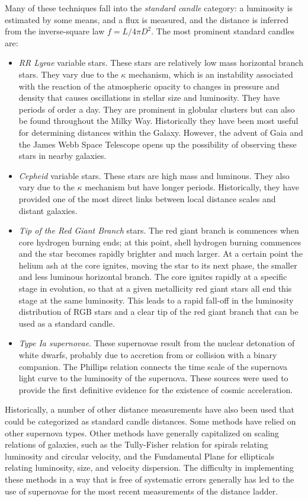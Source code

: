 Many of these techniques fall into the {\it standard candle} category:
a luminosity is estimated by some means, and a flux is measured, and
the distance is inferred from the inverse-square law $f=L/4\pi D^2$.
The most prominent standard candles are:
\begin{itemize}
\item {\it RR Lyrae} variable stars. These stars are relatively low mass
  horizontal branch stars. They vary due to the $\kappa$ mechanism,
  which is an instability associated with the reaction of the
  atmospheric opacity to changes in pressure and density that causes
  oscillations in stellar size and luminosity.  They have periods of
  order a day. They are prominent in globular clusters but can also be
  found throughout the Milky Way. Historically they have been most
  useful for determining distances within the Galaxy. However, the
  advent of Gaia and the James Webb Space Telescope opens up the
  possibility of observing these stars in nearby galaxies.
\item {\it Cepheid} variable stars. These stars are high mass and
  luminous.  They also vary due to the $\kappa$ mechanism but have
  longer periods. Historically, they have provided one of the most
  direct links between local distance scales and distant galaxies.
\item {\it Tip of the Red Giant Branch} stars. The red giant branch is
  commences when core hydrogen burning ends; at this point, shell
  hydrogen burning commences and the star becomes rapidly brighter and
  much larger. At a certain point the helium ash at the core ignites,
  moving the star to its next phase, the smaller and less luminous
  horizontal branch. The core ignites rapidly at a specific stage in
  evolution, so that at a given metallicity red giant stars all end
  this stage at the same luminosity. This leads to a rapid fall-off in
  the luminosity distribution of RGB stars and a clear tip of the red
  giant branch that can be used as a standard candle.
\item {\it Type Ia supernovae}. These supernovae result from the
  nuclear detonation of white dwarfs, probably due to accretion from
  or collision with a binary companion. The Phillips relation connects
  the time scale of the supernova light curve to the luminosity of the
  supernova. These sources were used to provide the first definitive
  evidence for the existence of cosmic acceleration.
\end{itemize}
Historically, a number of other distance measurements have also been
used that could be categorized as standard candle distances. Some
methods have relied on other supernova types. Other methods have
generally capitalized on scaling relations of galaxies, such as the
Tully-Fisher relation for spirals relating luminosity and circular
velocity, and the Fundamental Plane for ellipticals relating
luminosity, size, and velocity dispersion. The difficulty in
implementing these methods in a way that is free of systematic errors
generally has led to the use of supernovae for the most recent
measurements of the distance ladder.

